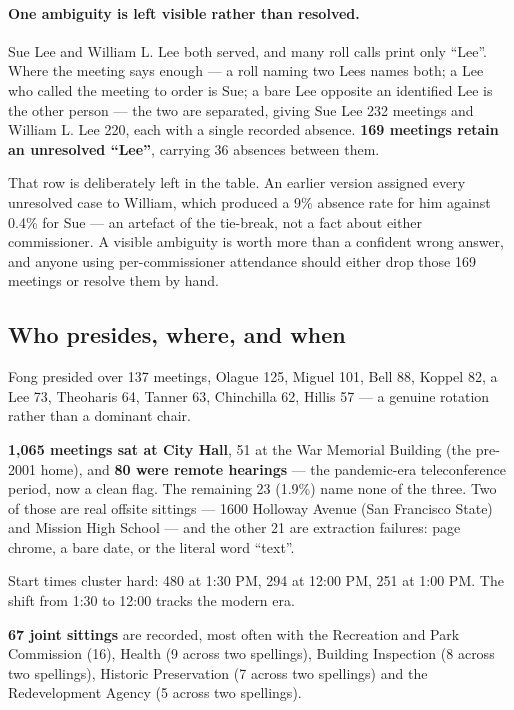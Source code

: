 \documentclass[11pt]{article}
\begin{document}
\paragraph{One ambiguity is left visible rather than resolved.} Sue Lee and William L. Lee
both served, and many roll calls print only ``Lee''. Where the meeting says enough --- a
roll naming two Lees names both; a Lee who called the meeting to order is Sue; a bare Lee
opposite an identified Lee is the other person --- the two are separated, giving Sue Lee 232
meetings and William L. Lee 220, each with a single recorded absence. \textbf{169 meetings
retain an unresolved ``Lee''}, carrying 36 absences between them.

That row is deliberately left in the table. An earlier version assigned every unresolved
case to William, which produced a 9\% absence rate for him against 0.4\% for Sue --- an
artefact of the tie-break, not a fact about either commissioner. A visible ambiguity is
worth more than a confident wrong answer, and anyone using per-commissioner attendance
should either drop those 169 meetings or resolve them by hand.

\subsection{Who presides, where, and when}

Fong presided over 137 meetings, Olague 125, Miguel 101, Bell 88, Koppel 82, a Lee 73,
Theoharis 64, Tanner 63, Chinchilla 62, Hillis 57 --- a genuine rotation rather than a
dominant chair.

\textbf{1{,}065 meetings sat at City Hall}, 51 at the War Memorial Building (the pre-2001
home), and \textbf{80 were remote hearings} --- the pandemic-era teleconference period, now
a clean flag. The remaining 23 (1.9\%) name none of the three. Two of those are real offsite
sittings --- 1600 Holloway Avenue (San Francisco State) and Mission High School --- and the
other 21 are extraction failures: page chrome, a bare date, or the literal word ``text''.

Start times cluster hard: 480 at 1:30 PM, 294 at 12:00 PM, 251 at 1:00 PM. The shift from
1:30 to 12:00 tracks the modern era.

\textbf{67 joint sittings} are recorded, most often with the Recreation and Park Commission
(16), Health (9 across two spellings), Building Inspection (8 across two spellings), Historic
Preservation (7 across two spellings) and the Redevelopment Agency (5 across two spellings).
\end{document}
